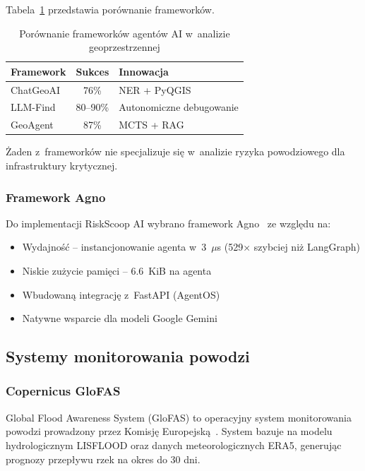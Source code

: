 Tabela~\ref{tab:ai-agents-comparison} przedstawia porównanie frameworków.

\begin{table}[H]
    \centering
    \caption{Porównanie frameworków agentów AI w~analizie geoprzestrzennej}
    \begin{tabular}{|l|c|l|}
        \hline
        \textbf{Framework} & \textbf{Sukces} & \textbf{Innowacja} \\
        \hline
        ChatGeoAI & 76\% & NER + PyQGIS \\
        \hline
        LLM-Find & 80--90\% & Autonomiczne debugowanie \\
        \hline
        GeoAgent & 87\% & MCTS + RAG \\
        \hline
    \end{tabular}
    \label{tab:ai-agents-comparison}
\end{table}

Żaden z~frameworków nie specjalizuje się w~analizie ryzyka powodziowego dla infrastruktury krytycznej.

\subsubsection{Framework Agno}

Do implementacji RiskScoop AI wybrano framework Agno~\cite{agno2024} ze względu na:
\begin{itemize}
    \item Wydajność -- instancjonowanie agenta w~3~$\mu$s (529× szybciej niż LangGraph)
    \item Niskie zużycie pamięci -- 6.6~KiB na agenta
    \item Wbudowaną integrację z~FastAPI (AgentOS)
    \item Natywne wsparcie dla modeli Google Gemini
\end{itemize}

\subsection{Systemy monitorowania powodzi}

\subsubsection{Copernicus GloFAS}

Global Flood Awareness System (GloFAS) to operacyjny system monitorowania powodzi prowadzony przez Komisję Europejską~\cite{jrc2020glofas}. System bazuje na modelu hydrologicznym LISFLOOD oraz danych meteorologicznych ERA5, generując prognozy przepływu rzek na okres do 30 dni.

